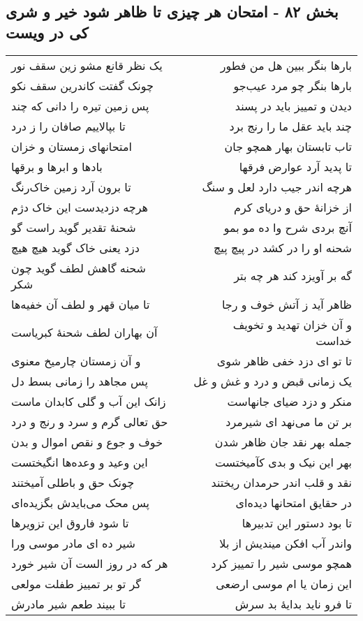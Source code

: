 \begin{center}
\section*{بخش ۸۲ - امتحان هر چیزی تا ظاهر شود خیر و شری کی در ویست}
\label{sec:sh082}
\begin{longtable}{l p{0.5cm} r}
یک نظر قانع مشو زین سقف نور
&&
بارها بنگر ببین هل من فطور
\\
چونک گفتت کاندرین سقف نکو
&&
بارها بنگر چو مرد عیب‌جو
\\
پس زمین تیره را دانی که چند
&&
دیدن و تمییز باید در پسند
\\
تا بپالاییم صافان را ز درد
&&
چند باید عقل ما را رنج برد
\\
امتحانهای زمستان و خزان
&&
تاب تابستان بهار همچو جان
\\
بادها و ابرها و برقها
&&
تا پدید آرد عوارض فرقها
\\
تا برون آرد زمین خاک‌رنگ
&&
هرچه اندر جیب دارد لعل و سنگ
\\
هرچه دزدیدست این خاک دژم
&&
از خزانهٔ حق و دریای کرم
\\
شحنهٔ تقدیر گوید راست گو
&&
آنچ بردی شرح وا ده مو بمو
\\
دزد یعنی خاک گوید هیچ هیچ
&&
شحنه او را در کشد در پیچ پیچ
\\
شحنه گاهش لطف گوید چون شکر
&&
گه بر آویزد کند هر چه بتر
\\
تا میان قهر و لطف آن خفیه‌ها
&&
ظاهر آید ز آتش خوف و رجا
\\
آن بهاران لطف شحنهٔ کبریاست
&&
و آن خزان تهدید و تخویف خداست
\\
و آن زمستان چارمیخ معنوی
&&
تا تو ای دزد خفی ظاهر شوی
\\
پس مجاهد را زمانی بسط دل
&&
یک زمانی قبض و درد و غش و غل
\\
زانک این آب و گلی کابدان ماست
&&
منکر و دزد ضیای جانهاست
\\
حق تعالی گرم و سرد و رنج و درد
&&
بر تن ما می‌نهد ای شیرمرد
\\
خوف و جوع و نقص اموال و بدن
&&
جمله بهر نقد جان ظاهر شدن
\\
این وعید و وعده‌ها انگیختست
&&
بهر این نیک و بدی کآمیختست
\\
چونک حق و باطلی آمیختند
&&
نقد و قلب اندر حرمدان ریختند
\\
پس محک می‌بایدش بگزیده‌ای
&&
در حقایق امتحانها دیده‌ای
\\
تا شود فاروق این تزویرها
&&
تا بود دستور این تدبیرها
\\
شیر ده ای مادر موسی ورا
&&
واندر آب افکن میندیش از بلا
\\
هر که در روز الست آن شیر خورد
&&
همچو موسی شیر را تمییز کرد
\\
گر تو بر تمییز طفلت مولعی
&&
این زمان یا ام موسی ارضعی
\\
تا ببیند طعم شیر مادرش
&&
تا فرو ناید بدایهٔ بد سرش
\\
\end{longtable}
\end{center}
